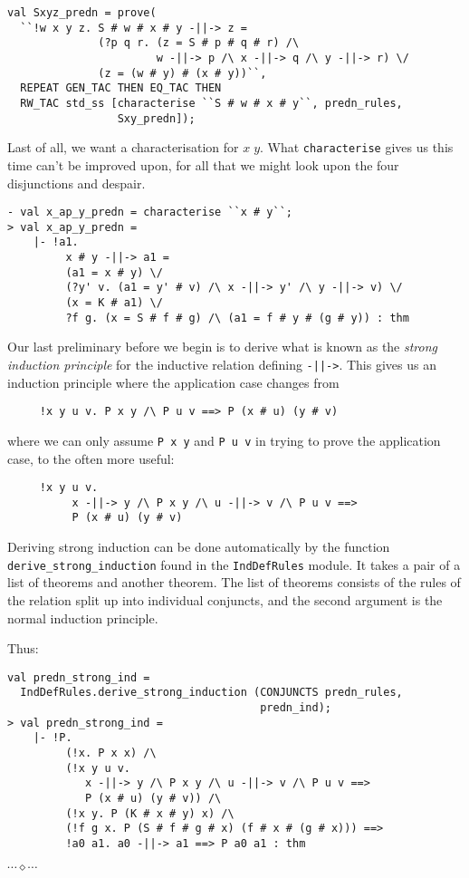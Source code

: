 \documentclass[12pt]{article}
\newcommand{\eos}{\hfill{}$\cdots\diamond\cdots$\hfill{}\vspace{5mm}}
\begin{document}
\begin{session}\begin{verbatim}
val Sxyz_predn = prove(
  ``!w x y z. S # w # x # y -||-> z =
              (?p q r. (z = S # p # q # r) /\
                       w -||-> p /\ x -||-> q /\ y -||-> r) \/
              (z = (w # y) # (x # y))``,
  REPEAT GEN_TAC THEN EQ_TAC THEN
  RW_TAC std_ss [characterise ``S # w # x # y``, predn_rules,
                 Sxy_predn]);
\end{verbatim}\end{session}
Last of all, we want a characterisation for $x\;y$.   What
\texttt{characterise} gives us this time can't be improved upon,
for all that we might look upon the four disjunctions and despair.
\begin{session}\begin{verbatim}
- val x_ap_y_predn = characterise ``x # y``;
> val x_ap_y_predn =
    |- !a1.
         x # y -||-> a1 =
         (a1 = x # y) \/
         (?y' v. (a1 = y' # v) /\ x -||-> y' /\ y -||-> v) \/
         (x = K # a1) \/
         ?f g. (x = S # f # g) /\ (a1 = f # y # (g # y)) : thm
\end{verbatim}\end{session}
Our last preliminary before we begin is to derive what is known as the
\emph{strong induction principle} for the inductive relation
defining \texttt{-||->}.  This gives us an induction principle where
the application case changes from
\begin{verbatim}
     !x y u v. P x y /\ P u v ==> P (x # u) (y # v)
\end{verbatim}
where we can only assume \texttt{P x y} and \texttt{P u v} in trying
to prove the application case, to the often more useful:
\begin{verbatim}
     !x y u v.
          x -||-> y /\ P x y /\ u -||-> v /\ P u v ==>
          P (x # u) (y # v)
\end{verbatim}
Deriving strong induction can be done automatically by the function\linebreak
\texttt{derive\_strong\_induction} found in the \texttt{IndDefRules}
module.  It takes a pair of a list of theorems and another theorem.
The list of theorems consists of the rules of the relation split up
into individual conjuncts, and the second argument is the normal
induction principle.

Thus:
\begin{session}\begin{verbatim}
val predn_strong_ind =
  IndDefRules.derive_strong_induction (CONJUNCTS predn_rules,
                                       predn_ind);
> val predn_strong_ind =
    |- !P.
         (!x. P x x) /\
         (!x y u v.
            x -||-> y /\ P x y /\ u -||-> v /\ P u v ==>
            P (x # u) (y # v)) /\
         (!x y. P (K # x # y) x) /\
         (!f g x. P (S # f # g # x) (f # x # (g # x))) ==>
         !a0 a1. a0 -||-> a1 ==> P a0 a1 : thm
\end{verbatim}\end{session}
\eos{}
\end{document}
